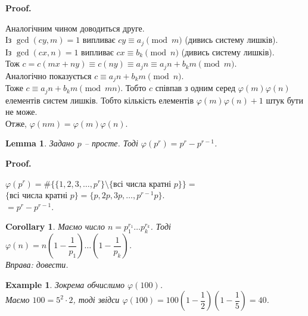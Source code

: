 \documentclass[a4paper, 10pt]{article}
\makeatletter
\theoremstyle{theoremdd}
\theoremstyle{theoremdd}
\theoremstyle{theoremdd}
\theoremstyle{theoremdd}
\newtheorem{example}[theorem]{Example}
\theoremstyle{theoremdd}
\theoremstyle{theoremdd}
\theoremstyle{theoremdd}
\newtheorem{lemma}[theorem]{Lemma}
\theoremstyle{theoremdd}
\newtheorem{corollary}[theorem]{Corollary}
\renewenvironment{proof}[1][Proof.\\]{\par
\pushQED{\hfill \qed}%
\normalfont \topsep6\p@\@plus6\p@\relax
\trivlist
\item\relax
{\bfseries
#1\@addpunct{.}}\hspace\labelsep\ignorespaces
}{%
\popQED\endtrivlist\@endpefalse
}
\makeatother
\begin{document}
\begin{proof}
Аналогічним чином доводиться друге.\\
Із $\gcd(cy,m) = 1$ випливає $cy \equiv a_j \pmod m$ (дивись систему лишків).\\
Із $\gcd(cx,n) = 1$ випливає $cx \equiv b_k \pmod n$ (дивись систему лишків).\\
Тож $c = c(mx+ny) \equiv c(ny) \equiv a_j n \equiv a_jn + b_km \pmod m$.\\
Аналогічно показується $c \equiv a_jn+b_km \pmod n$.\\
Тоже $c \equiv a_j n + b_k m \pmod {mn}$. Тобто $c$ співпав з одним серед $\varphi(m)\varphi(n)$ елементів систем лишків. Тобто кількість елементів $\varphi(m)\varphi(n) + 1$ штук бути не може.\\
Отже, $\varphi(nm) = \varphi(m) \varphi(n)$.
\end{proof}

\begin{lemma}
Задано $p$ -- просте. Тоді $\varphi(p^r) = p^r - p^{r-1}$.
\end{lemma}

\begin{proof}
$\varphi(p^r) = \# \{ \{1,2,3,\dots,p^r\} \setminus \{ \text{всі числа кратні }p \} \} \boxed{=}$\\
$\{\text{всі числа кратні }p\} = \{p,2p,3p,\dots,p^{r-1}p\}$.\\
$\boxed{=} p^r - p^{r-1}$.
\end{proof}

\begin{corollary}
Маємо число $n = p_1^{r_1} \dots p_k^{r_k}$. Тоді\\
$\varphi(n) = n \left( 1 - \dfrac{1}{p_1} \right) \dots \left( 1 - \dfrac{1}{p_k} \right)$.\\
\textit{Вправа: довести.}
\end{corollary}

\begin{example}
Зокрема обчислимо $\varphi(100)$.\\
Маємо $100 = 5^2 \cdot 2$, тоді звідси $\varphi(100) = 100 \left( 1 - \dfrac{1}{2} \right) \left( 1 - \dfrac{1}{5} \right) = 40$.
\end{example}
\end{document}
